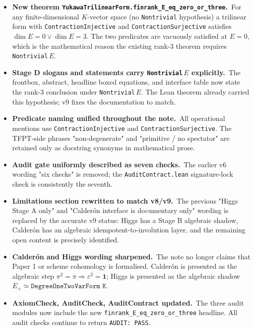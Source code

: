 \begin{itemize}[leftmargin=1.6em, itemsep=2pt]
\item \textbf{New theorem
    \texttt{YukawaTrilinearForm.finrank\_E\_eq\_zero\_or\_three}.}\
    For any finite-dimensional $K$-vector space (no
    \texttt{Nontrivial} hypothesis) a trilinear form with
    \texttt{ContractionInjective} and
    \texttt{ContractionSurjective} satisfies
    $\dim E = 0 \lor \dim E = 3$. The two predicates are
    vacuously satisfied at $E = 0$, which is the mathematical
    reason the existing rank-3 theorem requires
    \texttt{Nontrivial}\,$E$.

\item \textbf{Stage D slogans and statements carry
    \texttt{Nontrivial}\,$E$ explicitly.}\ The frontbox,
    abstract, headline boxed equations, and interface table now
    state the rank-3 conclusion under \texttt{Nontrivial}\,$E$.
    The Lean theorem already carried this hypothesis; v9 fixes
    the documentation to match.

\item \textbf{Predicate naming unified throughout the note.}\
    All operational mentions use \texttt{ContractionInjective}
    and \texttt{ContractionSurjective}. The TFPT-side phrases
    "non-degenerate" and "primitive / no spectator" are
    retained only as docstring synonyms in mathematical prose.

\item \textbf{Audit gate uniformly described as seven checks.}\
    The earlier v6 wording "six checks" is removed; the
    \texttt{AuditContract.lean} signature-lock check is
    consistently the seventh.

\item \textbf{Limitations section rewritten to match v8/v9.}\
    The previous "Higgs Stage A only" and "Calder\'on interface
    is documentary only" wording is replaced by the accurate v9
    status: Higgs has a Stage B algebraic shadow, Calder\'on has
    an algebraic idempotent-to-involution layer, and the
    remaining open content is precisely identified.

\item \textbf{Calder\'on and Higgs wording sharpened.}\ The note
    no longer claims that Paper 1 or scheme cohomology is
    formalised. Calder\'on is presented as the algebraic step
    $\pi^2 = \pi \Rightarrow \varepsilon^2 = \mathbf 1$; Higgs is
    presented as the algebraic shadow $E_+ \simeq
    \texttt{DegreeOneTwoVarForm K}$.

\item \textbf{AxiomCheck, AuditCheck, AuditContract updated.}\
    The three audit modules now include the new
    \texttt{finrank\_E\_eq\_zero\_or\_three} headline. All
    audit checks continue to return \texttt{AUDIT:\ PASS}.
\end{itemize}

